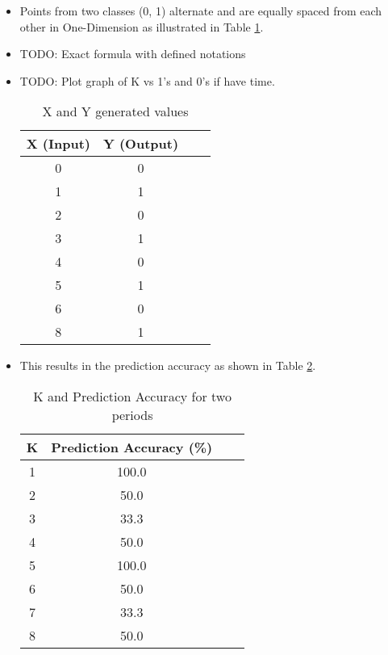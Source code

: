 \documentclass[a4paper,12pt]{article}
\begin{document}
\begin{itemize}
\item Points from two classes (0, 1) alternate and are equally spaced from each other in One-Dimension as illustrated in Table \ref{table:generatedXY}. 
\item TODO: Exact formula with defined notations

\item TODO: Plot graph of K vs 1's and 0's if have time. 
\begin{table}[ht]
\centering %
\begin{tabular}{c c c c} %
\hline %
X (Input) & Y (Output) \\ [0.5ex] 
\hline
0 & 0 \\ 
1 & 1 \\
2 & 0 \\
3 & 1 \\
4 & 0 \\
5 & 1 \\
6 & 0 \\
8 & 1 \\ [1ex] %
\hline
\end{tabular}
\caption{X and Y generated values}\label{table:generatedXY} 
\end{table}
\item This results in the prediction accuracy as shown in Table \ref{table:kAccuracy}.
\begin{table}[ht]
\centering %
\begin{tabular}{c c c c} %
\hline %
K & Prediction Accuracy (\%) \\ [0.5ex] 
\hline
1 & 100.0 \\ 
2 & 50.0 \\
3 & 33.3 \\
4 & 50.0 \\
5 & 100.0 \\
6 & 50.0 \\
7 & 33.3 \\
8 & 50.0 \\ [1ex] %
\hline
\end{tabular}
\caption{K and Prediction Accuracy for two periods}
\label{table:kAccuracy}
\end{table}
\end{itemize}
\end{document}

